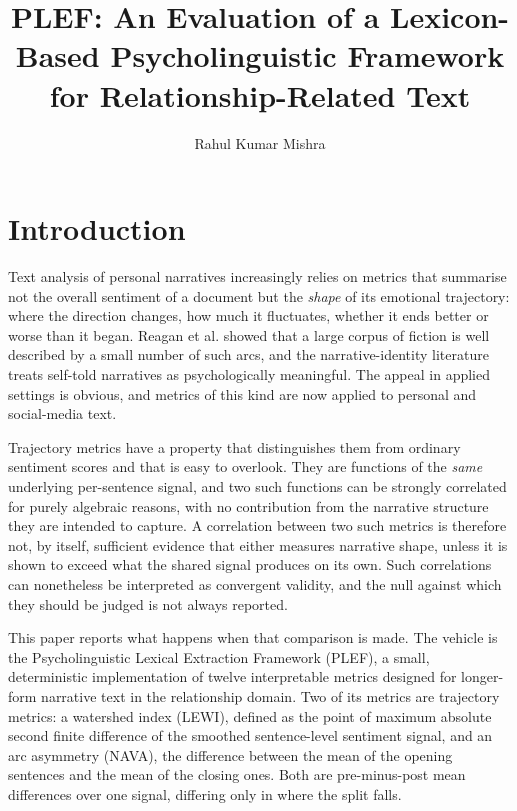 \documentclass[fleqn,10pt]{wlscirep}
\title{PLEF: An Evaluation of a Lexicon-Based Psycholinguistic Framework for Relationship-Related Text}
\author[1,*]{Rahul Kumar Mishra}
\affil[1]{Independent Researcher, Ranchi, Jharkhand, India 834012. ORCID: \href{https://orcid.org/0009-0004-9671-4055}{0009-0004-9671-4055}}
\affil[*]{mishra.rahul98@gmail.com}
\begin{document}

\flushbottom
\maketitle
\thispagestyle{empty}

\section{Introduction}\label{sec:intro}

Text analysis of personal narratives increasingly relies on metrics that summarise not the overall sentiment of a document but the \emph{shape} of its emotional trajectory: where the direction changes, how much it fluctuates, whether it ends better or worse than it began. Reagan et al.\cite{reagan2016} showed that a large corpus of fiction is well described by a small number of such arcs, and the narrative-identity literature treats self-told narratives as psychologically meaningful\cite{mcadams2013}. The appeal in applied settings is obvious, and metrics of this kind are now applied to personal and social-media text.

Trajectory metrics have a property that distinguishes them from ordinary sentiment scores and that is easy to overlook. They are functions of the \emph{same} underlying per-sentence signal, and two such functions can be strongly correlated for purely algebraic reasons, with no contribution from the narrative structure they are intended to capture. A correlation between two such metrics is therefore not, by itself, sufficient evidence that either measures narrative shape, unless it is shown to exceed what the shared signal produces on its own. Such correlations can nonetheless be interpreted as convergent validity, and the null against which they should be judged is not always reported.

This paper reports what happens when that comparison is made. The vehicle is the Psycholinguistic Lexical Extraction Framework (PLEF), a small, deterministic implementation of twelve interpretable metrics designed for longer-form narrative text in the relationship domain. Two of its metrics are trajectory metrics: a watershed index (LEWI), defined as the point of maximum absolute second finite difference of the smoothed sentence-level sentiment signal, and an arc asymmetry (NAVA), the difference between the mean of the opening sentences and the mean of the closing ones. Both are pre-minus-post mean differences over one signal, differing only in where the split falls.
\end{document}
